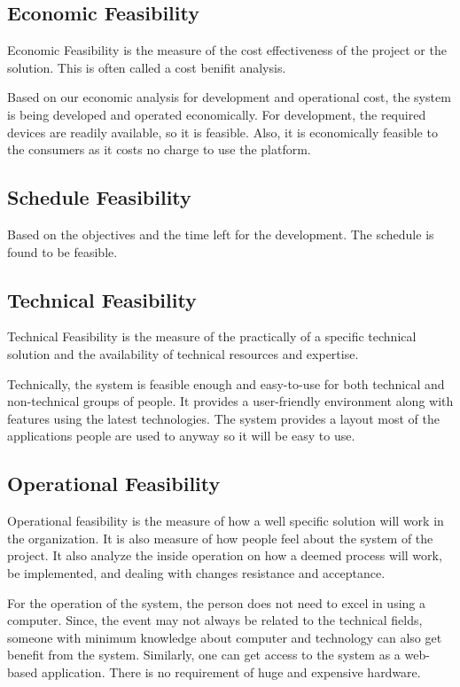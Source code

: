 \subsection{Economic Feasibility}
Economic Feasibility is the measure of the cost effectiveness of the project or the solution. This is often called a cost benifit analysis. \par
Based on our economic analysis for development and operational cost,
the system is being developed and operated economically. For development,
the required devices are readily available, so it is feasible. Also,
it is economically feasible to the consumers as it costs no charge to use the platform.

\subsection{Schedule Feasibility}
Based on the objectives and the time left for the development.
The schedule is found to be feasible.

\subsection{Technical Feasibility}
Technical Feasibility is the measure of the practically of a specific technical solution and the availability of technical resources and expertise.\par
Technically, the system is feasible enough and easy-to-use
for both technical and non-technical groups of people. It provides
a user-friendly environment along with features using the latest technologies.
The system provides a layout most of the applications people are used to anyway
so it will be easy to use.

\subsection{Operational Feasibility}
Operational feasibility is the measure of how a well specific solution will work in the organization.
It is also measure of how people feel about the system of the project. It also analyze the inside operation on how a deemed process
will work, be implemented, and dealing with changes resistance and acceptance.\par
For the operation of the system, the person does
not need to excel in using a computer. Since, the event
may not always be related to the technical fields, someone
with minimum knowledge about computer and technology can also get
benefit from the system. Similarly, one can get access to the system
as a web-based application. There is no requirement of huge and expensive hardware.

